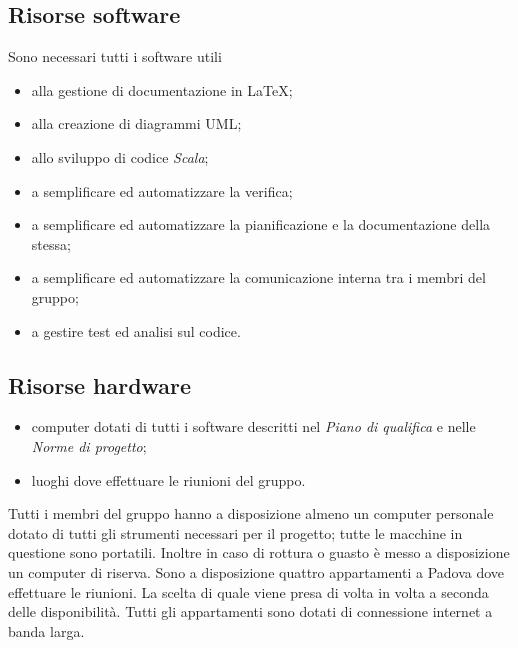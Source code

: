 \documentclass[a4paper]{report}
\begin{document}
			\subsection{Risorse software}
				Sono necessari tutti i software utili
				\begin{itemize}
					\item alla gestione di documentazione in \LaTeX;
					\item alla creazione di diagrammi UML;
					\item allo sviluppo di codice \emph{Scala};
					\item a semplificare ed automatizzare la verifica;
					\item a semplificare ed automatizzare la pianificazione e la documentazione della stessa;
					\item a semplificare ed automatizzare la comunicazione interna tra i membri del gruppo;
					\item a gestire test ed analisi sul codice.
				\end{itemize}
				\subsection{Risorse hardware}
					\begin{itemize}
						\item computer dotati di tutti i software descritti nel \emph{Piano di qualifica} e nelle
						\emph{Norme di progetto};
						\item luoghi dove effettuare le riunioni del gruppo.
					\end{itemize}
				Tutti i membri del gruppo hanno a disposizione almeno un computer personale dotato di tutti gli strumenti
				necessari per il progetto; tutte le macchine in questione sono portatili. Inoltre in caso di rottura o guasto
				è messo a disposizione un computer di riserva. Sono a disposizione quattro appartamenti a Padova dove
				effettuare le riunioni. La scelta di quale viene presa di volta in volta a seconda delle disponibilità. Tutti
				gli appartamenti sono dotati di connessione internet a banda larga.				
				
\end{document}
